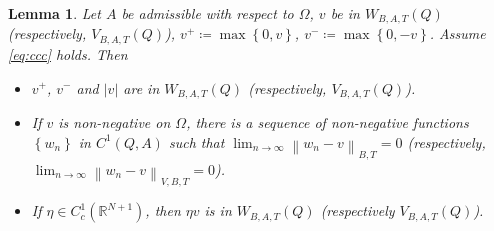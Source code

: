 \documentclass[11pt, a4paper]{article}
\newtheorem{lemma}[theorem]{Lemma}
\numberwithin{equation}{section}
\newcommand{\RR}{{\mathbb R}}
\newcommand{\norm}[1]{\left\lVert #1\right\rVert}
\begin{document}
\begin{lemma}
  Let $A$ be admissible with respect to $\Omega$, $v$ be in
  $W_{B,A,T}(Q)$ (respectively, $V_{B,A,T}(Q)$),
  $v^{+}\coloneqq \max\left\{0,v\right\}$,
  $v^{-}\coloneqq \max\left\{0,-v\right\}$.  Assume \eqref{eq:ccc}
  holds. Then 
  \begin{itemize}
  \item[ $(i)$]  $v^{+}$, $v^{-}$ and $|v|$ are in
  $W_{B,A,T}(Q)$ (respectively, $V_{B,A,T}(Q)$).
\item[$(ii)$] If $v$ is
  non-negative on $\Omega$, there is a sequence of non-negative
  functions $\left\{w_{n}\right\}$ in $C^{1}(Q,A)$ such that
  $\lim_{n\to\infty}\norm{w_{n}-v}_{B,T}=0$ (respectively,
  $\lim_{n\to\infty}\norm{w_{n}-v}_{V,B,T}=0$).
\item[$(iii)$] If $\eta\in C^{1}_{c}(\RR^{N+1})$, then $\eta v$ is in
  $W_{B,A,T}(Q)$ (respectively $V_{B,A,T}(Q)$).
  
  \end{itemize}
 \label{w1bb}
\end{lemma}
\end{document}
